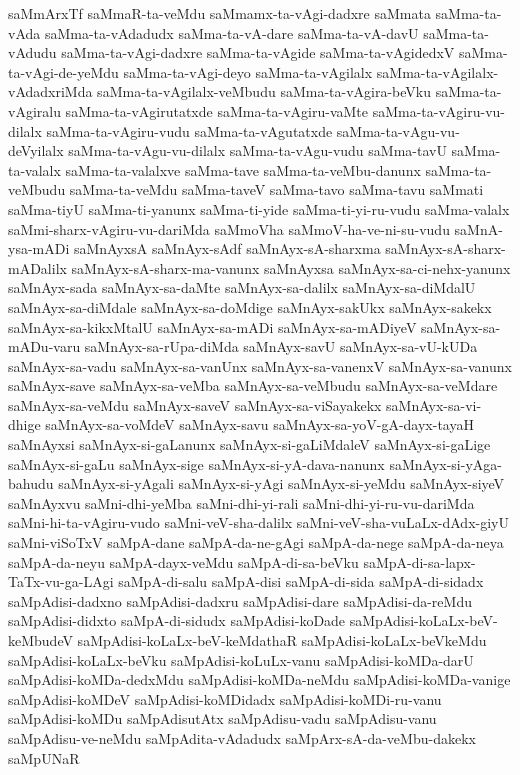 {saMmArxTf
saMmaR-ta-veMdu
saMmamx-ta-vAgi-dadxre
saMmata
saMma-ta-vAda
saMma-ta-vAdadudx
saMma-ta-vA-dare
saMma-ta-vA-davU
saMma-ta-vAdudu
saMma-ta-vAgi-dadxre
saMma-ta-vAgide
saMma-ta-vAgidedxV
saMma-ta-vAgi-de-yeMdu
saMma-ta-vAgi-deyo
saMma-ta-vAgilalx
saMma-ta-vAgilalx-vAdadxriMda
saMma-ta-vAgilalx-veMbudu
saMma-ta-vAgira-beVku
saMma-ta-vAgiralu
saMma-ta-vAgirutatxde
saMma-ta-vAgiru-vaMte
saMma-ta-vAgiru-vu-dilalx
saMma-ta-vAgiru-vudu
saMma-ta-vAgutatxde
saMma-ta-vAgu-vu-deVyilalx
saMma-ta-vAgu-vu-dilalx
saMma-ta-vAgu-vudu
saMma-tavU
saMma-ta-valalx
saMma-ta-valalxve
saMma-tave
saMma-ta-veMbu-danunx
saMma-ta-veMbudu
saMma-ta-veMdu
saMma-taveV
saMma-tavo
saMma-tavu
saMmati
saMma-tiyU
saMma-ti-yanunx
saMma-ti-yide
saMma-ti-yi-ru-vudu
saMma-valalx
saMmi-sharx-vAgiru-vu-dariMda
saMmoVha
saMmoV-ha-ve-ni-su-vudu
saMnA-ysa-mADi
saMnAyxsA
saMnAyx-sAdf
saMnAyx-sA-sharxma
saMnAyx-sA-sharx-mADalilx
saMnAyx-sA-sharx-ma-vanunx
saMnAyxsa
saMnAyx-sa-ci-nehx-yanunx
saMnAyx-sada
saMnAyx-sa-daMte
saMnAyx-sa-dalilx
saMnAyx-sa-diMdalU
saMnAyx-sa-diMdale
saMnAyx-sa-doMdige
saMnAyx-sakUkx
saMnAyx-sakekx
saMnAyx-sa-kikxMtalU
saMnAyx-sa-mADi
saMnAyx-sa-mADiyeV
saMnAyx-sa-mADu-varu
saMnAyx-sa-rUpa-diMda
saMnAyx-savU
saMnAyx-sa-vU-kUDa
saMnAyx-sa-vadu
saMnAyx-sa-vanUnx
saMnAyx-sa-vanenxV
saMnAyx-sa-vanunx
saMnAyx-save
saMnAyx-sa-veMba
saMnAyx-sa-veMbudu
saMnAyx-sa-veMdare
saMnAyx-sa-veMdu
saMnAyx-saveV
saMnAyx-sa-viSayakekx
saMnAyx-sa-vi-dhige
saMnAyx-sa-voMdeV
saMnAyx-savu
saMnAyx-sa-yoV-gA-dayx-tayaH
saMnAyxsi
saMnAyx-si-gaLanunx
saMnAyx-si-gaLiMdaleV
saMnAyx-si-gaLige
saMnAyx-si-gaLu
saMnAyx-sige
saMnAyx-si-yA-dava-nanunx
saMnAyx-si-yAga-bahudu
saMnAyx-si-yAgali
saMnAyx-si-yAgi
saMnAyx-si-yeMdu
saMnAyx-siyeV
saMnAyxvu
saMni-dhi-yeMba
saMni-dhi-yi-rali
saMni-dhi-yi-ru-vu-dariMda
saMni-hi-ta-vAgiru-vudo
saMni-veV-sha-dalilx
saMni-veV-sha-vuLaLx-dAdx-giyU
saMni-viSoTxV
saMpA-dane
saMpA-da-ne-gAgi
saMpA-da-nege
saMpA-da-neya
saMpA-da-neyu
saMpA-dayx-veMdu
saMpA-di-sa-beVku
saMpA-di-sa-lapx-TaTx-vu-ga-LAgi
saMpA-di-salu
saMpA-disi
saMpA-di-sida
saMpA-di-sidadx
saMpAdisi-dadxno
saMpAdisi-dadxru
saMpAdisi-dare
saMpAdisi-da-reMdu
saMpAdisi-didxto
saMpA-di-sidudx
saMpAdisi-koDade
saMpAdisi-koLaLx-beV-keMbudeV
saMpAdisi-koLaLx-beV-keMdathaR
saMpAdisi-koLaLx-beVkeMdu
saMpAdisi-koLaLx-beVku
saMpAdisi-koLuLx-vanu
saMpAdisi-koMDa-darU
saMpAdisi-koMDa-dedxMdu
saMpAdisi-koMDa-neMdu
saMpAdisi-koMDa-vanige
saMpAdisi-koMDeV
saMpAdisi-koMDidadx
saMpAdisi-koMDi-ru-vanu
saMpAdisi-koMDu
saMpAdisutAtx
saMpAdisu-vadu
saMpAdisu-vanu
saMpAdisu-ve-neMdu
saMpAdita-vAdadudx
saMpArx-sA-da-veMbu-dakekx
saMpUNaR
}
